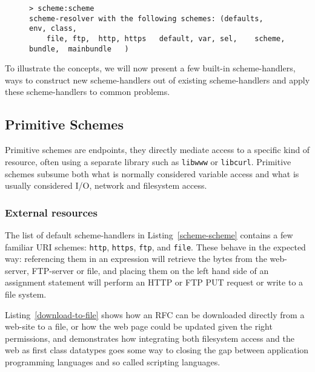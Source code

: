 \documentclass[preprint]{sigplanconf}
\begin{document}
\vspace{-0.5em}
\begin{figure}[htbp]
\begin{lstlisting}[style=numbers,label=scheme-scheme,caption=List of schemes via scheme:scheme.]
> scheme:scheme 
scheme-resolver with the following schemes: (defaults,  env, class,
    file, ftp,  http, https   default, var, sel,    scheme,    bundle,  mainbundle   )
\end{lstlisting}
\end{figure}
\vspace{-0.5em}

To illustrate the concepts, we will now present a few built-in scheme-handlers, ways to construct new
scheme-handlers out of existing scheme-handlers and apply these scheme-handlers to common
problems.

\subsection{Primitive Schemes}
\label{primitiveSchemes}

Primitive schemes are endpoints, they directly
mediate access to a specific kind of resource, often using a separate
library such as {\tt libwww} or {\tt libcurl}.  Primitive schemes
subsume both what is normally considered variable access and 
what is usually considered I/O, network and filesystem access.


\subsubsection{External resources}
\label{externalResources}

The list of default scheme-handlers in Listing~\ref{scheme-scheme} contains a few familiar URI schemes:
{\tt http}, {\tt https}, {\tt ftp}, and {\tt file}.   These behave in the expected way:   referencing them in an expression will
retrieve the bytes from the web-server, FTP-server or file, and placing them on the left hand side of
an assignment statement will perform an HTTP or FTP PUT request or write to a file system. 
 
Listing~\ref{download-to-file} shows how an RFC can be downloaded directly from a web-site
to a file, or how the web page could be updated given the right permissions, and demonstrates how integrating both filesystem access and the web as first class datatypes
goes some way to closing the gap between application programming languages and so called
scripting languages.
\end{document}
